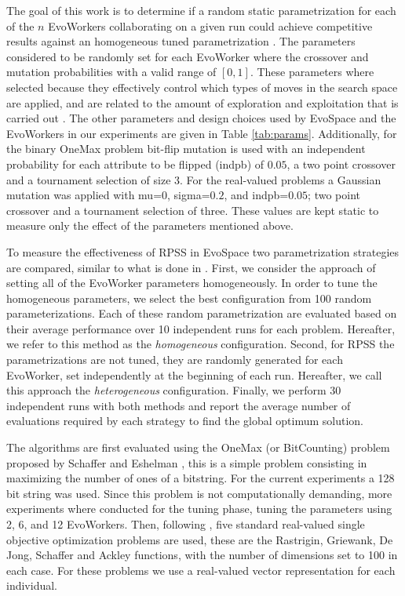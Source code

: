 \documentclass{llncs}
\begin{document}
The goal of this work is to determine if a random static parametrization for each of the $n$ EvoWorkers 
collaborating on a given run could achieve competitive results against an homogeneous tuned parametrization
\cite{fuku1,fuku2,garcia2014randomized}. The parameters considered to be randomly set for each EvoWorker 
where the crossover and mutation probabilities with a valid range of $[0,1]$. These parameters where 
selected because they effectively control which types of moves in the search space are
applied, and are related to the amount of exploration and exploitation that is carried out \cite{}.
The other parameters and design choices used by EvoSpace and the EvoWorkers in our experiments are given in 
Table \ref{tab:params}. Additionally, for the binary OneMax problem bit-flip mutation
is used with an independent probability for each attribute to be flipped (indpb) of $0.05$, 
a two point crossover and a tournament selection of size 3. For the real-valued problems a Gaussian
mutation was applied with mu=$0$, sigma=$0.2$, and indpb=$0.05$; two point crossover and
a tournament selection of three. These values are kept static to measure only the effect of the 
parameters mentioned above.



To measure the effectiveness of RPSS in EvoSpace two parametrization strategies are compared, 
similar to what is done in \cite{fuku1,fuku2,garcia2014randomized}. First, we consider the approach of setting all 
of the EvoWorker parameters homogeneously. In order to tune the homogeneous parameters,
we select the best configuration from 100 random parameterizations. 
Each of these random parametrization are evaluated based on their average performance over 10 
independent runs for each problem.
Hereafter, we refer to this method as the {\em homogeneous} configuration. Second, for RPSS the parametrizations
are not tuned, they are randomly generated for each EvoWorker, set independently at the beginning of each run.
Hereafter, we call this approach the {\em heterogeneous} configuration. Finally, we perform 30 independent runs
with both methods and report the average number of evaluations required by each strategy to find the
global optimum solution.

The algorithms are first evaluated using the OneMax (or BitCounting) problem proposed by 
Schaffer and Eshelman \cite{SE91}, this is a simple problem consisting in maximizing the number 
of ones of a bitstring. For the current experiments a 128 bit string was used. Since this
problem is not computationally demanding, more experiments where conducted for the tuning phase, 
tuning the parameters using 2, 6, and 12 EvoWorkers. Then, following \cite{fuku1}, 
five standard real-valued single objective optimization problems 
are used, these are the Rastrigin, Griewank, De Jong, Schaffer  and Ackley functions, 
with the number of dimensions set to 100 in each case. For these problems we use a real-valued vector
representation for each individual.
\end{document}
